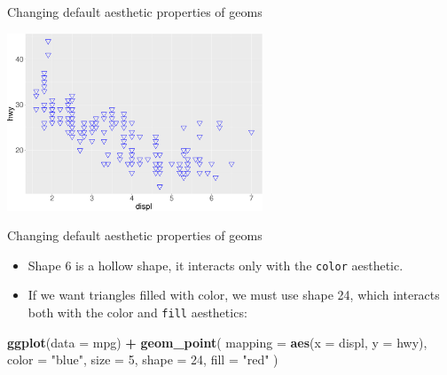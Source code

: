 \documentclass[ignorenonframetext,]{beamer}
\newenvironment{Shaded}{\begin{snugshade}}{\end{snugshade}}
\newcommand{\DataTypeTok}[1]{\textcolor[rgb]{0.13,0.29,0.53}{#1}}
\newcommand{\DecValTok}[1]{\textcolor[rgb]{0.00,0.00,0.81}{#1}}
\newcommand{\KeywordTok}[1]{\textcolor[rgb]{0.13,0.29,0.53}{\textbf{#1}}}
\newcommand{\NormalTok}[1]{#1}
\newcommand{\OperatorTok}[1]{\textcolor[rgb]{0.81,0.36,0.00}{\textbf{#1}}}
\newcommand{\StringTok}[1]{\textcolor[rgb]{0.31,0.60,0.02}{#1}}
\begin{document}
\begin{frame}{Changing default aesthetic properties of geoms}
\protect\hypertarget{changing-default-aesthetic-properties-of-geoms-7}{}

\begin{center}\includegraphics[height=200px]{data-visualization_files/figure-beamer/unnamed-chunk-43-1} \end{center}

\end{frame}

\begin{frame}[fragile]{Changing default aesthetic properties of geoms}
\protect\hypertarget{changing-default-aesthetic-properties-of-geoms-8}{}

\begin{itemize}
\item
  Shape 6 is a hollow shape, it interacts only with the \texttt{color}
  aesthetic.
\item
  If we want triangles filled with color, we must use shape 24, which
  interacts both with the color and \texttt{fill} aesthetics:
\end{itemize}

\begin{Shaded}
\begin{Highlighting}[]
\KeywordTok{ggplot}\NormalTok{(}\DataTypeTok{data =}\NormalTok{ mpg) }\OperatorTok{+}
\StringTok{  }\KeywordTok{geom_point}\NormalTok{(}
    \DataTypeTok{mapping =} \KeywordTok{aes}\NormalTok{(}\DataTypeTok{x =}\NormalTok{ displ, }\DataTypeTok{y =}\NormalTok{ hwy),}
    \DataTypeTok{color =} \StringTok{"blue"}\NormalTok{,}
    \DataTypeTok{size =} \DecValTok{5}\NormalTok{,}
    \DataTypeTok{shape =} \DecValTok{24}\NormalTok{,}
    \DataTypeTok{fill =} \StringTok{"red"}
\NormalTok{  )}
\end{Highlighting}
\end{Shaded}

\end{frame}
\end{document}
